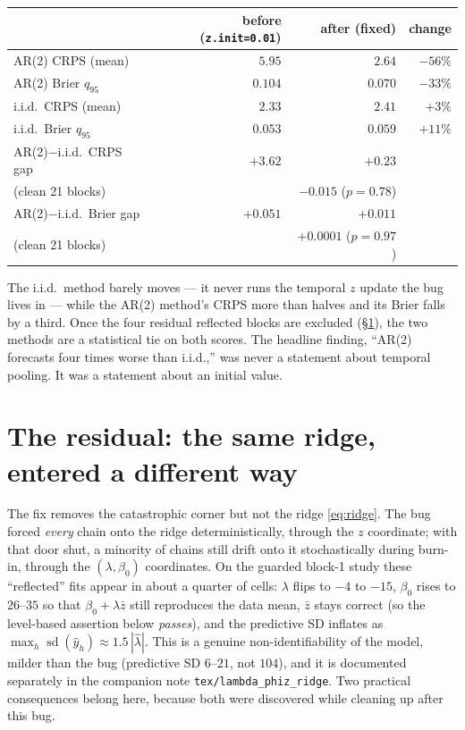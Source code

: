 \documentclass[11pt]{article}
\newcommand{\code}[1]{\texttt{#1}}
\DeclareMathOperator{\sd}{sd}
\begin{document}
\begin{center}
\begin{tabular}{lrrr}
\toprule
 & \textbf{before} (\code{z.init=0.01}) & \textbf{after} (fixed) & change \\
\midrule
AR(2) CRPS (mean)        & $5.95$   & $2.64$   & $-56\%$ \\
AR(2) Brier $q_{95}$     & $0.104$  & $0.070$  & $-33\%$ \\
i.i.d.\ CRPS (mean)      & $2.33$   & $2.41$   & $+3\%$ \\
i.i.d.\ Brier $q_{95}$   & $0.053$  & $0.059$  & $+11\%$ \\
\midrule
AR(2)$-$i.i.d.\ CRPS gap  & $+3.62$  & $+0.23$  & \\
\quad (clean 21 blocks)   &          & $-0.015$ ($p = 0.78$) & \\
AR(2)$-$i.i.d.\ Brier gap  & $+0.051$ & $+0.011$ & \\
\quad (clean 21 blocks)   &          & $+0.0001$ ($p = 0.97$) & \\
\bottomrule
\end{tabular}
\end{center}

The i.i.d.\ method barely moves --- it never runs the temporal $z$ update the
bug lives in --- while the AR(2) method's CRPS more than halves and its Brier
falls by a third. Once the four residual reflected blocks are excluded
(\S\ref{sec:residual}), the two methods are a statistical tie on both scores.
The headline finding, ``AR(2) forecasts four times worse than i.i.d.,'' was
never a statement about temporal pooling. It was a statement about an initial
value.

\section{The residual: the same ridge, entered a different way}
\label{sec:residual}

The fix removes the catastrophic corner but not the ridge \eqref{eq:ridge}.
The bug forced \emph{every} chain onto the ridge deterministically, through
the $z$ coordinate; with that door shut, a minority of chains still drift onto
it stochastically during burn-in, through the $(\lambda, \beta_0)$
coordinates. On the guarded block-1 study these ``reflected'' fits appear in
about a quarter of cells: $\lambda$ flips to $-4$ to $-15$, $\beta_0$ rises to
$26$--$35$ so that $\beta_0 + \lambda\bar z$ still reproduces the data mean,
$\bar z$ stays correct (so the level-based assertion below \emph{passes}), and
the predictive SD inflates as $\max_h \sd(\hat y_h) \approx 1.5\,|\hat\lambda|$.
This is a genuine non-identifiability of the model, milder than the bug
(predictive SD $6$--$21$, not $104$), and it is documented separately in the
companion note \code{tex/lambda\_phiz\_ridge}. Two practical consequences
belong here, because both were discovered while cleaning up after this bug.
\end{document}
